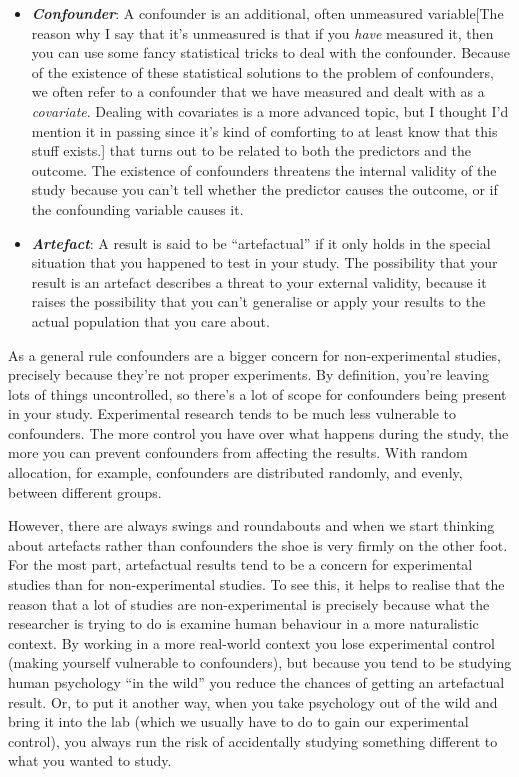 \documentclass[
]{book}
\providecommand{\tightlist}{%
  \setlength{\itemsep}{0pt}\setlength{\parskip}{0pt}}
\begin{document}
\begin{itemize}
\tightlist
\item
  \textbf{\emph{Confounder}}: A confounder is an additional, often unmeasured variable{[}The reason why I say that it's unmeasured is that if you \emph{have} measured it, then you can use some fancy statistical tricks to deal with the confounder. Because of the existence of these statistical solutions to the problem of confounders, we often refer to a confounder that we have measured and dealt with as a \emph{covariate}. Dealing with covariates is a more advanced topic, but I thought I'd mention it in passing since it's kind of comforting to at least know that this stuff exists.{]} that turns out to be related to both the predictors and the outcome. The existence of confounders threatens the internal validity of the study because you can't tell whether the predictor causes the outcome, or if the confounding variable causes it.
\item
  \textbf{\emph{Artefact}}: A result is said to be ``artefactual'' if it only holds in the special situation that you happened to test in your study. The possibility that your result is an artefact describes a threat to your external validity, because it raises the possibility that you can't generalise or apply your results to the actual population that you care about.
\end{itemize}

As a general rule confounders are a bigger concern for non-experimental studies, precisely because they're not proper experiments. By definition, you're leaving lots of things uncontrolled, so there's a lot of scope for confounders being present in your study. Experimental research tends to be much less vulnerable to confounders. The more control you have over what happens during the study, the more you can prevent confounders from affecting the results. With random allocation, for example, confounders are distributed randomly, and evenly, between different groups.

However, there are always swings and roundabouts and when we start thinking about artefacts rather than confounders the shoe is very firmly on the other foot. For the most part, artefactual results tend to be a concern for experimental studies than for non-experimental studies. To see this, it helps to realise that the reason that a lot of studies are non-experimental is precisely because what the researcher is trying to do is examine human behaviour in a more naturalistic context. By working in a more real-world context you lose experimental control (making yourself vulnerable to confounders), but because you tend to be studying human psychology ``in the wild'' you reduce the chances of getting an artefactual result. Or, to put it another way, when you take psychology out of the wild and bring it into the lab (which we usually have to do to gain our experimental control), you always run the risk of accidentally studying something different to what you wanted to study.
\end{document}
